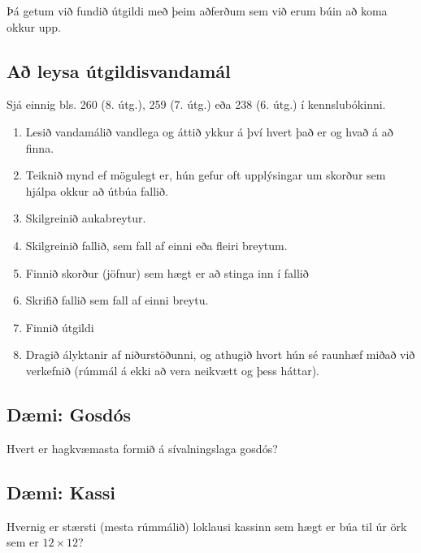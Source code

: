 \documentclass[a4paper,10pt,icelandic]{sphinxmanual}
\begin{document}
Þá getum við fundið útgildi með þeim aðferðum sem við erum búin að koma
okkur upp.


\subsection{Að leysa útgildisvandamál}
\label{\detokenize{kafli05:a-leysa-utgildisvandamal}}
Sjá einnig bls. 260 (8. útg.), 259 (7. útg.) eða 238 (6. útg.) í kennslubókinni.
\begin{enumerate}
\item {} 
Lesið vandamálið vandlega og áttið ykkur á því hvert það er og
hvað á að finna.

\item {} 
Teiknið mynd ef mögulegt er, hún gefur oft upplýsingar um skorður
sem hjálpa okkur að útbúa fallið.

\item {} 
Skilgreinið aukabreytur.

\item {} 
Skilgreinið fallið, sem fall af einni eða fleiri breytum.

\item {} 
Finnið skorður (jöfnur) sem hægt er að stinga inn í fallið

\item {} 
Skrifið fallið sem fall af einni breytu.

\item {} 
Finnið útgildi

\item {} 
Dragið ályktanir af niðurstöðunni, og athugið hvort hún sé
raunhæf miðað við verkefnið (rúmmál á ekki að vera neikvætt og
þess háttar).

\end{enumerate}


\subsection{Dæmi: Gosdós}
\label{\detokenize{kafli05:daemi-gosdos}}
Hvert er hagkvæmasta formið á sívalningslaga gosdós?



\subsection{Dæmi: Kassi}
\label{\detokenize{kafli05:daemi-kassi}}
Hvernig er stærsti (mesta rúmmálið) loklausi kassinn sem hægt er búa til úr
örk sem er \(12 \times 12\)?
\end{document}
